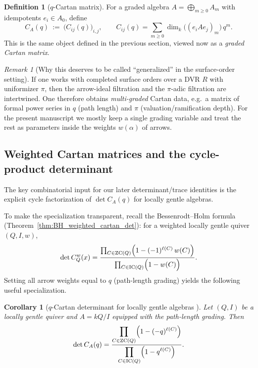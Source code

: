 \documentclass[11pt,oneside]{amsbook}
\numberwithin{equation}{section}
\theoremstyle{plain}
\newtheorem{corollary}[theorem]{Corollary}
\theoremstyle{definition}
\newtheorem{definition}[theorem]{Definition}
\theoremstyle{remark}
\newtheorem{remark}[theorem]{Remark}
\begin{document}
\begin{definition}[$q$-Cartan matrix]
For a graded algebra $A=\bigoplus_{m\ge 0}A_m$ with idempotents $e_i\in A_0$, define
\[
C_A(q)\ :=\ \bigl(C_{ij}(q)\bigr)_{i,j},
\qquad
C_{ij}(q)=\sum_{m\ge 0}\dim_k\!\bigl((e_iAe_j)_m\bigr)\,q^m.
\]
This is the same object defined in the previous section, viewed now as a \emph{graded Cartan matrix}.
\end{definition}

\begin{remark}[Why this deserves to be called ``generalized'' in the surface-order setting]
If one works with completed surface orders over a DVR $R$ with uniformizer $\pi$, then the arrow-ideal filtration and the $\pi$-adic filtration are intertwined.
One therefore obtains \emph{multi-graded} Cartan data, e.g.\ a matrix of formal power series in $q$ (path length) and $\pi$ (valuation/ramification depth).
For the present manuscript we mostly keep a single grading variable and treat the rest as parameters inside the weights $w(\alpha)$ of arrows.
\end{remark}

\subsection{Weighted Cartan matrices and the cycle-product determinant}
The key combinatorial input for our later determinant/trace identities is the explicit cycle factorization of $\det C_A(q)$ for locally gentle algebras.

To make the specialization transparent, recall the Bessenrodt--Holm formula (Theorem~\ref{thm:BH_weighted_cartan_det}):
for a weighted locally gentle quiver $(Q,I,w)$,
\[
\det C_Q^w(x)
=
\frac{\prod_{C\in \mathrm{ZC}(Q)} \Bigl(1-(-1)^{\ell(C)}\,w(C)\Bigr)}
{\prod_{C\in \mathrm{IC}(Q)} \Bigl(1-w(C)\Bigr)}.
\]
Setting all arrow weights equal to $q$ (path-length grading) yields the following useful specialization.

\begin{corollary}[$q$-Cartan determinant for locally gentle algebras \cite{BessenrodtHolm2005WeightedLocallyGentle}]
\label{cor:qcartan_det_simple}
Let $(Q,I)$ be a locally gentle quiver and $A=kQ/I$ equipped with the path-length grading.
Then
\begin{equation}
\label{eq:qcartan_det_simple}
\det C_A(q)
=
\frac{\displaystyle\prod_{C\in \mathrm{ZC}(Q)} \Bigl(1-(-q)^{\ell(C)}\Bigr)}
{\displaystyle\prod_{C\in \mathrm{IC}(Q)} \Bigl(1-q^{\ell(C)}\Bigr)}.
\end{equation}
\end{corollary}
\end{document}
